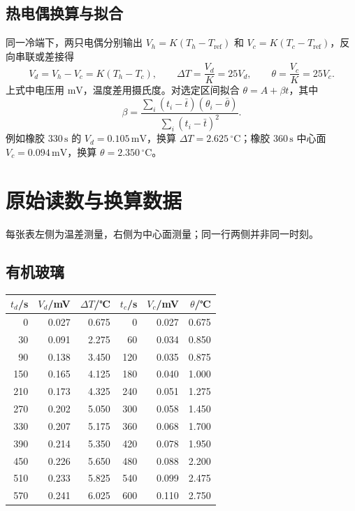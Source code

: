 \documentclass[UTF8,a4paper,11pt]{ctexart}
\newcommand{\unit}[1]{\,\mathrm{#1}}
\begin{document}
\subsection{热电偶换算与拟合}
同一冷端下，两只电偶分别输出 $V_h=K(T_h-T_{\mathrm{ref}})$ 和 $V_c=K(T_c-T_{\mathrm{ref}})$，反向串联或差接得
\[
V_d=V_h-V_c=K(T_h-T_c),\qquad
\Delta T=\frac{V_d}{K}=25V_d,\qquad \theta=\frac{V_c}{K}=25V_c.
\]
上式中电压用 $\mathrm{mV}$，温度差用摄氏度。对选定区间拟合 $\theta=A+\beta t$，其中
\[
\beta=\frac{\sum_i(t_i-\bar t)(\theta_i-\bar\theta)}{\sum_i(t_i-\bar t)^2}.
\]
\noindent 例如橡胶 $330\unit{s}$ 的 $V_d=0.105\unit{mV}$，换算 $\Delta T=2.625\,{}^\circ\mathrm C$；橡胶 $360\unit{s}$ 中心面 $V_c=0.094\unit{mV}$，换算 $\theta=2.350\,{}^\circ\mathrm C$。

\clearpage
\section{原始读数与换算数据}
每张表左侧为温差测量，右侧为中心面测量；同一行两侧并非同一时刻。
\subsection{有机玻璃}
\begin{center}\small
\begin{tabular}{rrrrrr}\toprule
$t_d$/s & $V_d$/mV & $\Delta T$/℃ & $t_c$/s & $V_c$/mV & $\theta$/℃\\\midrule
0 & 0.027 & 0.675 & 0 & 0.027 & 0.675 \\
30 & 0.091 & 2.275 & 60 & 0.034 & 0.850 \\
90 & 0.138 & 3.450 & 120 & 0.035 & 0.875 \\
150 & 0.165 & 4.125 & 180 & 0.040 & 1.000 \\
210 & 0.173 & 4.325 & 240 & 0.051 & 1.275 \\
270 & 0.202 & 5.050 & 300 & 0.058 & 1.450 \\
330 & 0.207 & 5.175 & 360 & 0.068 & 1.700 \\
390 & 0.214 & 5.350 & 420 & 0.078 & 1.950 \\
450 & 0.226 & 5.650 & 480 & 0.088 & 2.200 \\
510 & 0.233 & 5.825 & 540 & 0.099 & 2.475 \\
570 & 0.241 & 6.025 & 600 & 0.110 & 2.750 \\
\bottomrule\end{tabular}\end{center}
\end{document}

